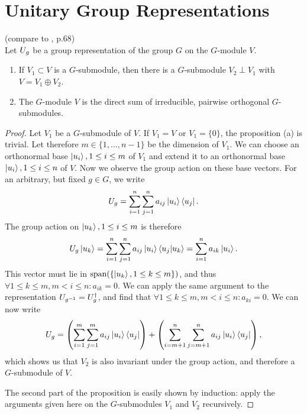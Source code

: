 \documentclass[a4paper,11pt, BCOR=4mm, DIV=12, pagesize]{scrartcl}
\begin{document}
\section{Unitary Group Representations}
\begin{prop}(compare to \cite{rep}, p.68) \label{thm:directsum}\\
 Let $U_{g}$ be a group representation of the group $G$ on the $G$-module 
$V$.  
\begin{enumerate}\renewcommand{\labelenumi}{(\alph{enumi})}
 \item If $V_1\subset V$ is a $G$-submodule, then there is a $G$-submodule 
  $V_2\perp V_1$ with $V = V_1 \oplus V_2$. 
\item The $G$-module $V$ is the direct sum of irreducible, pairwise orthogonal 
  $G$-submodules.
\end{enumerate}
\end{prop}
\begin{proof}
 Let $V_1$ be a $G$-submodule of $V$. If $V_1 = V$ or $V_1 = \{0\}$, the 
proposition (a) is trivial. Let therefore $m\in\{1,\ldots,n-1\}$ be the 
dimension of $V_1$. We can choose an orthonormal base $\ket{u_i}, 1\leq i\leq m$ 
of $V_1$ and extend it to an orthonormal base $\ket{u_i}, 1\leq i\leq n$ of $V$. 
Now we observe the group action on these base vectors. For an arbitrary, but 
fixed $g\in G$, we write 
\begin{equation}
 U_{g} = \sum\limits_{i=1}^{n}\sum\limits_{j=1}^{n} a_{ij} \ket{u_i}\bra{u_j}.
\end{equation}
The group action on $\ket{u_k}, 1\leq i\leq m$ is therefore
\begin{equation}
 U_{g}\ket{u_k} = \sum\limits_{i=1}^{n}\sum\limits_{j=1}^{n} a_{ij} 
\ket{u_i}\braket{u_j|u_k} = \sum\limits_{i=1}^{n} a_{ik}\ket{u_i}.
\end{equation}
This vector must lie in $\mathrm{span}(\{\ket{u_k}, 1\leq k\leq m\})$, and thus 
$\forall 1\leq k\leq m, m<i\leq n: a_{ik} = 0$. We can apply the same argument 
to the representation $U_{g^{-1}} = U_{g}^\dagger$, and find that 
$\forall 1\leq k\leq m, m<i\leq n: a_{ki} = 0$. We can now write 
\begin{equation}\label{eq:repsum}
 U_{g} = \left(\sum\limits_{i=1}^{m}\sum\limits_{j=1}^{m} a_{ij} 
\ket{u_i}\bra{u_j}\right) + \left(\sum\limits_{i=m+1}^{n}\sum\limits_{j=m+1}^{n} a_{ij} 
\ket{u_i}\bra{u_j}\right),
\end{equation}
which shows us that $V_2$ is also invariant under the group action, and 
therefore a $G$-submodule of $V$.

The second part of the proposition is easily shown by induction: apply 
the arguments given here on the $G$-submodules $V_1$ and $V_2$ recursively.
\end{proof}
\end{document}
